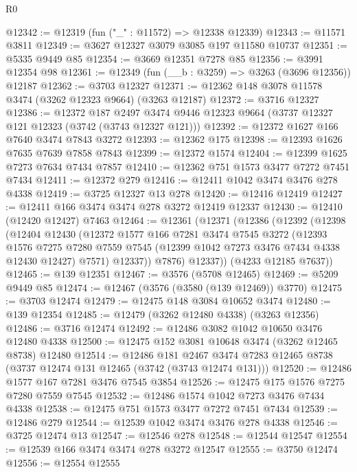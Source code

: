 \begin{lexlean}{R0}
\begin{coremodule}
@12342 := @12319 (fun ("_" : @11572) => @12338 @12339)
@12343 := @11571 @3811
@12349 := @3627 @12327 @3079 @3085 @197 @11580 @10737
@12351 := @5335 @9449 @85
@12354 := @3669 @12351 @7278 @85
@12356 := @3991 @12354 @98
@12361 := @12349 (fun (__b : @3259) => @3263 (@3696 @12356)) @12187
@12362 := @3703 @12327
@12371 := @12362 @148 @3078 @11578 @3474 (@3262 @12323 @9664) (@3263 @12187)
@12372 := @3716 @12327
@12386 := @12372
    @187
    @2497
    @3474
    @9446
    @12323
    @9664
    (@3737 @12327 @121 @12323 (@3742 (@3743 @12327 @121)))
@12392 := @12372 @1627 @166 @7640 @3474 @7843 @3272
@12393 := @12362 @175
@12398 := @12393 @1626 @7635 @7639 @7858 @7843
@12399 := @12372 @1574
@12404 := @12399 @1625 @7273 @7634 @7434 @7857
@12410 := @12362 @751 @1573 @3477 @7272 @7451 @7434
@12411 := @12372 @279
@12416 := @12411 @1042 @3474 @3476 @278 @4338
@12419 := @3725 @12327 @13 @278
@12420 := @12416 @12419
@12427 := @12411 @166 @3474 @3474 @278 @3272 @12419 @12337
@12430 := @12410 (@12420 @12427) @7463
@12464 := @12361
    (@12371
      (@12386
        (@12392
          (@12398
            (@12404
              @12430
              (@12372
                @1577
                @166
                @7281
                @3474
                @7545
                @3272
                (@12393
                  @1576
                  @7275
                  @7280
                  @7559
                  @7545
                  (@12399 @1042 @7273 @3476 @7434 @4338 @12430 @12427)
                  @7571)
                @12337))
            @7876)
          @12337))
      (@4233 @12185 @7637))
@12465 := @139 @12351
@12467 := @3576 (@5708 @12465)
@12469 := @5209 @9449 @85
@12474 := @12467 (@3576 (@3580 (@139 @12469)) @3770)
@12475 := @3703 @12474
@12479 := @12475 @148 @3084 @10652 @3474
@12480 := @139 @12354
@12485 := @12479 (@3262 @12480 @4338) (@3263 @12356)
@12486 := @3716 @12474
@12492 := @12486 @3082 @1042 @10650 @3476 @12480 @4338
@12500 := @12475 @152 @3081 @10648 @3474 (@3262 @12465 @8738) @12480
@12514 := @12486
    @181
    @2467
    @3474
    @7283
    @12465
    @8738
    (@3737 @12474 @131 @12465 (@3742 (@3743 @12474 @131)))
@12520 := @12486 @1577 @167 @7281 @3476 @7545 @3854
@12526 := @12475 @175 @1576 @7275 @7280 @7559 @7545
@12532 := @12486 @1574 @1042 @7273 @3476 @7434 @4338
@12538 := @12475 @751 @1573 @3477 @7272 @7451 @7434
@12539 := @12486 @279
@12544 := @12539 @1042 @3474 @3476 @278 @4338
@12546 := @3725 @12474 @13
@12547 := @12546 @278
@12548 := @12544 @12547
@12554 := @12539 @166 @3474 @3474 @278 @3272 @12547
@12555 := @3750 @12474
@12556 := @12554 @12555

\end{coremodule}
\end{lexlean}
